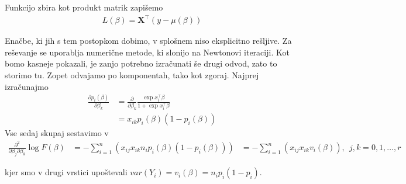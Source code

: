 \documentclass[12pt,a4paper]{amsart}
\theoremstyle{definition} %
\theoremstyle{plain} %
\begin{document}
Funkcijo zbira kot produkt matrik zapišemo
\begin{align}\label{prvi}
    L(\beta) = \mathbf{X}^\top(y - \mu(\beta))
\end{align}

Enačbe, ki jih s tem postopkom dobimo, v splošnem niso eksplicitno rešljive. Za reševanje se uporablja numerične metode, ki slonijo na Newtonovi iteraciji. Kot
bomo kasneje pokazali, je zanjo potrebno izračunati še drugi odvod, zato to storimo tu. Zopet odvajamo po komponentah, tako kot zgoraj. Najprej izračunajmo
\begin{align}
    \frac{\partial p_{i}(\beta)}{\partial \beta_{k}} &= \frac{\partial}{\partial \beta_{k}} \frac{\exp{x_{i}^\top\beta}}{1+\exp{x_{i}^\top\beta}} \nonumber \\
        &= x_{ik}p_{i}(\beta)(1 - p_{i}(\beta)) \nonumber
\end{align}
Vse sedaj skupaj sestavimo v
\begin{align}
    \frac{\partial^2}{\partial \beta_{j}\partial\beta_{k}} \log F(\beta) &= - \sum_{i=1}^{n}\left(x_{ij}x_{ik}n_{i}p_{i}(\beta)(1-p_{i}(\beta))\right)
    &= -\sum_{i=1}^{n}\left(x_{ij}x_{ik}v_{i}(\beta)\right),~~j,k = 0,1,\ldots, r
\end{align}

kjer smo v drugi vrstici upoštevali  $var(Y_{i}) = v_{i}(\beta) = n_{i}p_{i}(1-p_{i}).$
\end{document}

